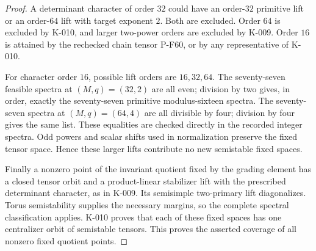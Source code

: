 \begin{proof}
A determinant character of order $32$ could have an order-$32$
primitive lift or an order-$64$ lift with target exponent $2$.
Both are excluded.  Order $64$ is excluded by K-010, and larger
two-power orders are excluded by K-009.  Order $16$ is attained by
the rechecked chain tensor P-F60, or by any representative of K-010.

For character order $16$, possible lift orders are $16,32,64$.
The seventy-seven feasible spectra at $(M,q)=(32,2)$ are all even;
division by two gives, in order, exactly the seventy-seven primitive
modulus-sixteen spectra.  The seventy-seven spectra at
$(M,q)=(64,4)$ are all divisible by four; division by four gives
the same list.  These equalities are checked directly in the
recorded integer spectra.  Odd powers and scalar shifts used in
normalization preserve the fixed tensor space.  Hence these larger
lifts contribute no new semistable fixed spaces.

Finally a nonzero point of the invariant quotient fixed by the
grading element has a closed tensor orbit and a product-linear
stabilizer lift with the prescribed determinant character, as in
K-009.  Its semisimple two-primary lift diagonalizes.  Torus
semistability supplies the necessary margins, so the complete
spectral classification applies.  K-010 proves that each of these
fixed spaces has one centralizer orbit of semistable tensors.
This proves the asserted coverage of all nonzero fixed quotient
points.
\end{proof}
